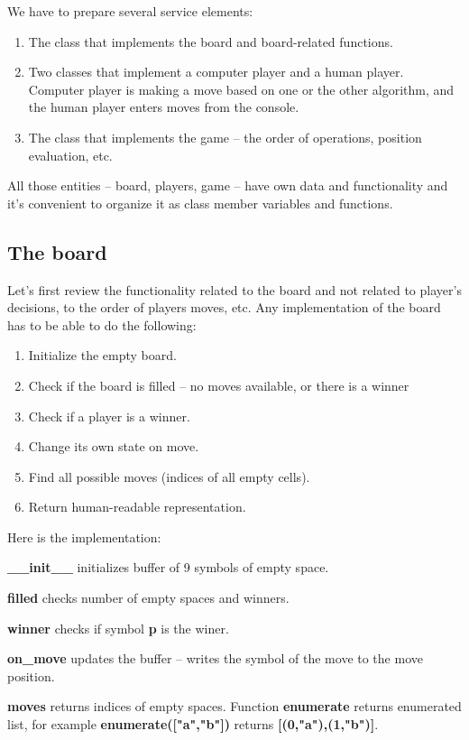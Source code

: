 We have to prepare several service elements:

\begin{enumerate}
\item The class that implements the board and board-related functions.
\item Two classes that implement a computer player and a human player.
Computer player is making a move based on one or the other algorithm, and
the human player enters moves from the console.
\item The class that implements the game -- the order of operations,
position evaluation, etc.
\end{enumerate}

All those entities -- board, players, game -- have own data and functionality
and it's convenient to organize it as class member variables and functions.

\subsection{The board}

Let's first review the functionality related to the board and
not related to player's decisions, to the order of players moves, etc.
Any implementation of the board has to be able to do the following:

\begin{enumerate}
\item Initialize the empty board.
\item Check if the board is filled -- no moves available, or there is a winner
\item Check if a player is a winner.
\item Change its own state on move.
\item Find all possible moves (indices of all empty cells).
\item Return human-readable representation.
\end{enumerate}

Here is the implementation:

\textbf{\_\_init\_\_} initializes buffer of 9 symbols of empty space.

\textbf{filled} checks number of empty spaces and winners.

\textbf{winner} checks if symbol \textbf{p} is the winer.

\textbf{on\_move} updates the buffer -- writes the symbol of the move
to the move position.

\textbf{moves} returns indices of empty spaces. Function \textbf{enumerate}
returns enumerated list, for example \textbf{enumerate(["a","b"])} returns
\textbf{[(0,"a"),(1,"b")]}.

